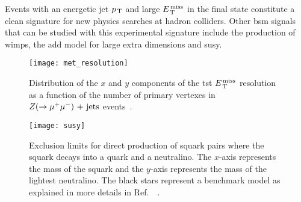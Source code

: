 Events with an energetic jet $p_\mathrm{\, T}$ and large $E_\mathrm{\, T}^\mathrm{\, miss}$ in the final state
constitute a clean signature for new physics searches at hadron colliders.
Other \gls{bsm} signals that can be studied with this experimental signature
include the production of \glspl{wimp}, the \gls{add} model for large extra
dimensions and \gls{susy}.
\begin{figure}[!h]
  \centering
  \texttt{[image: met\_resolution]}
  \caption{Distribution of the $x$ and $y$ components of the \gls{tst} $E_\mathrm{\, T}^\mathrm{\, miss}$
    resolution as a function of the number of primary vertexes in
    $Z (\rightarrow \mu^+ \mu^-)\mathrm{~+~jets}$ events~\cite{METResolution}.}
  \label{fig:met_resolution}
\end{figure}
\begin{figure}[!h]
  \centering
  \texttt{[image: susy]}
  \caption{Exclusion limits for direct production of squark
    pairs where the squark decays into a quark and a neutralino. The $x$-axis
    represents the mass of the squark and the $y$-axis represents the mass of
    the lightest neutralino. The black stars represent a benchmark model as
    explained in more details in Ref.~~\cite{SUSYPub}.}
  \label{fig:susy_exclusion}
\end{figure}
